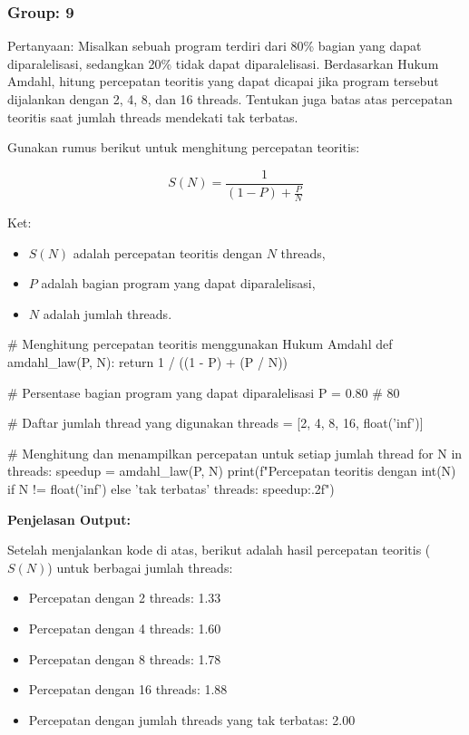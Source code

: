 \documentclass[12pt]{article}
\begin{document}
\subsubsection{Group: 9}
Pertanyaan:
Misalkan sebuah program terdiri dari 80\% bagian yang dapat diparalelisasi, sedangkan 20\% tidak dapat diparalelisasi. Berdasarkan Hukum Amdahl, hitung percepatan teoritis yang dapat dicapai jika program tersebut dijalankan dengan 2, 4, 8, dan 16 threads. Tentukan juga batas atas percepatan teoritis saat jumlah threads mendekati tak terbatas.

Gunakan rumus berikut untuk menghitung percepatan teoritis:

\[
S(N) = \frac{1}{(1 - P) + \frac{P}{N}}
\]

Ket:
\begin{itemize}
    \item \( S(N) \) adalah percepatan teoritis dengan \( N \) threads,
    \item \( P \) adalah bagian program yang dapat diparalelisasi,
    \item \( N \) adalah jumlah threads.
\end{itemize}

\begin{python}
    # Menghitung percepatan teoritis menggunakan Hukum Amdahl
def amdahl_law(P, N):
    return 1 / ((1 - P) + (P / N))

# Persentase bagian program yang dapat diparalelisasi
P = 0.80  # 80%

# Daftar jumlah thread yang digunakan
threads = [2, 4, 8, 16, float('inf')]

# Menghitung dan menampilkan percepatan untuk setiap jumlah thread
for N in threads:
    speedup = amdahl_law(P, N)
    print(f"Percepatan teoritis dengan {int(N) if N != float('inf') else 'tak terbatas'} threads: {speedup:.2f}")
\end{python}

\textbf{Penjelasan Output:}

Setelah menjalankan kode di atas, berikut adalah hasil percepatan teoritis (\(S(N)\)) untuk berbagai jumlah threads:

\begin{itemize}
    \item Percepatan dengan 2 threads: 1.33
    \item Percepatan dengan 4 threads: 1.60
    \item Percepatan dengan 8 threads: 1.78
    \item Percepatan dengan 16 threads: 1.88
    \item Percepatan dengan jumlah threads yang tak terbatas: 2.00
\end{itemize}
\end{document}
